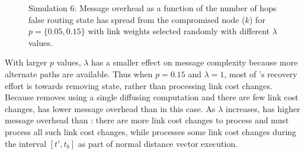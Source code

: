 \begin{figure}
\caption{Simulation 6: Message overhead as a function of the number of hops false routing state has spread from the compromised node ($k$) for $p=\{0.05,0.15\}$ \er with 
link weights selected randomly with different $\lambda$ values.}
\label{fig:lc}
\end{figure}


With larger $p$ values, $\lambda$ has a smaller effect on message complexity because more alternate paths are available. Thus when $p=0.15$ and $\lambda=1$,
most of \purges's recovery effort is towards removing \badvector state, rather than processing link cost changes.  Because
\cpr removes \badvector using a single diffusing computation and there are few link cost changes, \cpr has lower message overhead than \purge in this case. 
As $\lambda$ increases, \cpr has higher message overhead than \purges: there are more link cost changes to process and \cpr must process all such link cost changes, 
while \purge processes some link cost changes during the interval $[t',t_b]$ as part of normal distance vector execution. 

